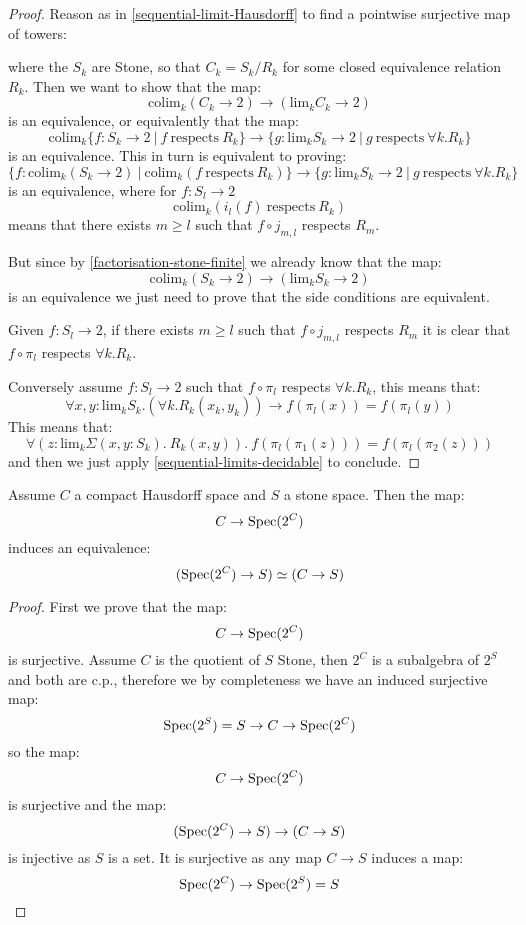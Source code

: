 \begin{proof}
Reason as in \cref{sequential-limit-Hausdorff} to find a pointwise surjective map of towers:
\begin{center}
\end{center}
where the $S_k$ are Stone, so that $C_k = S_k/R_k$ for some closed equivalence relation $R_k$. Then we want to show that the map:
\[\mathrm{colim}_k (C_k \to 2) \to (\mathrm{lim}_kC_k \to 2)\]
is an equivalence, or equivalently that the map:
\[\mathrm{colim}_k \{ f:S_k \to 2\ |\ f\ \mathrm{respects}\ R_k \}\to \{ g:\mathrm{lim}_kS_k \to 2\ |\ g\ \mathrm{respects}\ \forall k. R_k\}\]
is an equivalence. This in turn is equivalent to proving:
\[ \{ f : \mathrm{colim}_k (S_k \to 2)\ |\ \mathrm{colim}_k (f\ \mathrm{respects}\ R_k)\} \to \{ g:\mathrm{lim}_kS_k \to 2\ |\ g\ \mathrm{respects}\ \forall k. R_k\}\]
is an equivalence, where for $f:S_l\to 2$
\[\mathrm{colim}_k (i_l(f)\ \mathrm{respects}\ R_k)\]
means that there exists $m\geq l$ such that $f\circ j_{m,l}$ respects $R_m$.

But since by \cref{factorisation-stone-finite} we already know that the map:
\[\mathrm{colim}_k (S_k \to 2) \to (\mathrm{lim}_kS_k \to 2)\]
is an equivalence we just need to prove that the side conditions are equivalent.

Given $f:S_l\to 2$, if there exists $m\geq l$ such that $f\circ j_{m,l}$ respects $R_m$ it is clear that $f\circ \pi_l$ respects $\forall k. R_k$.

Conversely assume $f:S_l\to 2$ such that $f\circ \pi_l$ respects $\forall k. R_k$, this means that:
\[\forall x,y:\mathrm{lim}_k S_k. (\forall k. R_k(x_k,y_k) )\to f(\pi_l(x))=f(\pi_l(y))\]
This means that:
\[\forall (z : \mathrm{lim}_k \Sigma(x,y:S_k).\ R_k(x,y)).\ f(\pi_l(\pi_1(z)))=f(\pi_l(\pi_2(z)))\]
and then we just apply \cref{sequential-limits-decidable} to conclude.
\end{proof}

\begin{lemma}
Assume $C$ a compact Hausdorff space and $S$ a stone space. Then the map:
\[C\to \operatorname{Spec}(2^C)\]
induces an equivalence:
\[(\operatorname{Spec}(2^C) \to S) \simeq(C\to S) \]
\end{lemma}

\begin{proof}
First we prove that the map:
\[C\to \operatorname{Spec}(2^C)\]
is surjective. Assume $C$ is the quotient of $S$ Stone, then $2^C$ is a subalgebra of $2^S$ and both are c.p., therefore we by completeness we have an induced surjective map:
\[\operatorname{Spec}(2^S) = S\to C\to \operatorname{Spec}(2^C)\]
so the map:
\[C\to \operatorname{Spec}(2^C)\]
is surjective and the map:
\[(\operatorname{Spec}(2^C) \to S) \to (C\to S) \]
is injective as $S$ is a set. It is surjective as any map $C\to S$ induces a map:
\[\operatorname{Spec}(2^C) \to \operatorname{Spec}(2^S) = S\]
\end{proof}

